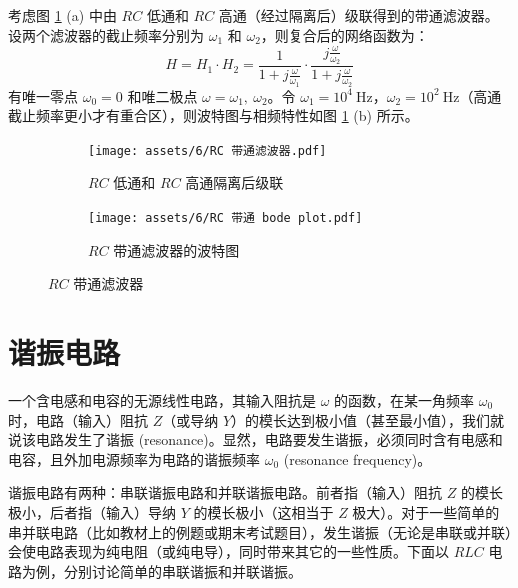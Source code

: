 \documentclass[UTF8]{report}
\def\Hz{\ \mathrm{Hz}}
\theoremstyle{MyLineTheoremStyle} %
\theoremstyle{MyBlockTheoremStyle} %
\theoremstyle{MySubsubsectionStyle} %
\begin{document}
考虑图 \ref{RC 带通滤波器} (a) 中由 $RC$ 低通和 $RC$ 高通（经过隔离后）级联得到的带通滤波器。设两个滤波器的截止频率分别为 $\omega_1$ 和 $\omega_2$，则复合后的网络函数为：
\begin{equation}
H = H_1 \cdot H_2 = \frac{1}{1 + j \frac{\omega}{\omega_1} } \cdot \frac{j \frac{\omega}{\omega_2} }{1 + j \frac{\omega}{\omega_2} }
\end{equation}
有唯一零点 $\omega_0 = 0$ 和唯二极点 $\omega = \omega_1, \ \omega_2$。令 $\omega_1 = 10^4 \Hz$，$\omega_2 = 10^2 \Hz$（高通截止频率更小才有重合区），则波特图与相频特性如图 \ref{RC 带通滤波器} (b) 所示。
\begin{figure}[H]\centering
\begin{subfigure}[b]{0.5\columnwidth}\centering
    \texttt{[image: assets/6/RC 带通滤波器.pdf]}
    \caption{$RC$ 低通和 $RC$ 高通隔离后级联}
\end{subfigure}\hfill
\begin{subfigure}[b]{0.5\columnwidth}\centering
    \texttt{[image: assets/6/RC 带通 bode plot.pdf]}
    \caption{$RC$ 带通滤波器的波特图}
\end{subfigure}
\caption{$RC$ 带通滤波器}
\label{RC 带通滤波器}
\end{figure}




\section{谐振电路}
一个含电感和电容的无源线性电路，其输入阻抗是 $\omega$ 的函数，在某一角频率 $\omega_0$ 时，电路（输入）阻抗 $Z$（或导纳 $Y$）的模长达到极小值（甚至最小值），我们就说该电路发生了谐振 (resonance)。显然，电路要发生谐振，必须同时含有电感和电容，且外加电源频率为电路的谐振频率 $\omega_0$ (resonance frequency)。


谐振电路有两种：串联谐振电路和并联谐振电路。前者指（输入）阻抗 $Z$ 的模长极小，后者指（输入）导纳 $Y$ 的模长极小（这相当于 $Z$ 极大）。对于一些简单的串并联电路（比如教材上的例题或期末考试题目），发生谐振（无论是串联或并联）会使电路表现为纯电阻（或纯电导），同时带来其它的一些性质。下面以 $RLC$ 电路为例，分别讨论简单的串联谐振和并联谐振。
\end{document}
